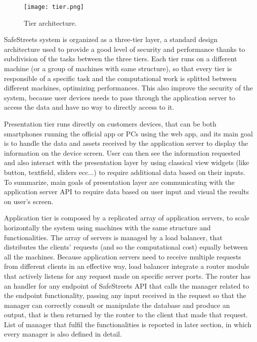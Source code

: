 \begin{figure}[H]
	\centering
	\texttt{[image: tier.png]}
	\caption{Tier architecture.}
\end{figure}

SafeStreets system is organized as a three-tier layer, a standard design architecture used to provide a good level of security and performance thanks to subdivision of the tasks between the three tiers. Each tier runs on a different machine (or a group of machines with same structure), so that every tier is responsible of a specific task and the computational work is splitted between different machines, optimizing performances. This also improve the security of the system, because user devices needs to pass through the application server to access the data and have no way to directly access to it. 

Presentation tier runs directly on customers devices, that can be both smartphones running the official app or PCs using the web app, and its main goal is to handle the data and assets received by the application server to display the information on the device screen. User can then see the information requested and also interact with the presentation layer by using classical view widgets (like button, textfield, sliders ecc...) to require additional data based on their inputs. To summarize, main goals of presentation layer are communicating with the application server API to require data based on user input and visual the results on user's screen.

Application tier is composed by a replicated array of application servers, to scale horizontally the system using machines with the same structure and functionalities. The array of servers is managed by a load balancer, that distributes the clients' requests (and so the computational cost) equally between all the machines. Because application servers need to receive multiple requests from different clients in an effective way, load balancer integrate a router module that actively listens for any request made on specific server ports. The router has an handler for any endpoint of SafeStreets API that calls the manager related to the endpoint functionality, passing any input received in the request so that the manager can correctly consult or manipulate the database and produce an output, that is then returned by the router to the client that made that request. List of manager that fulfil the functionalities is reported in later section, in which every manager is also defined in detail.

